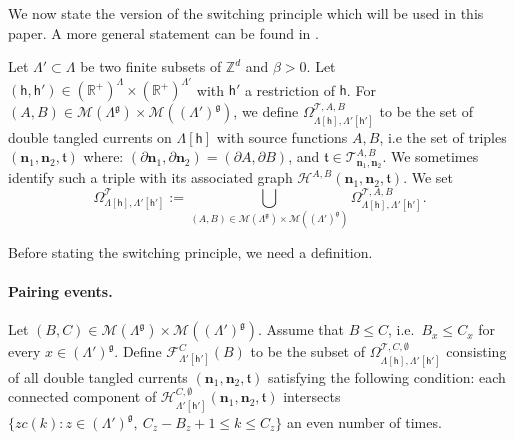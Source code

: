 \documentclass[11pt,a4paper]{article}
\theoremstyle{definition}
\numberwithin{equation}{section}
\newcommand\n{\mathbf{n}}
\newcommand\fg{\mathfrak{g}}
\newcommand\ft{\mathfrak{t}}
\newcommand\sn{\partial\mathbf{n}}
\begin{document}
We now state the version of the switching principle which will be used in this paper. A more general statement can be found in \cite{GunaratnamPanagiotisPanisSeveroPhi42022}.

Let $\Lambda'\subset \Lambda$ be two finite subsets of $\mathbb Z^d$ and $\beta>0$. Let $(\mathsf{h},\mathsf{h}')\in (\mathbb R^+)^\Lambda\times (\mathbb R^+)^{\Lambda'}$ with $\mathsf{h}'$ a restriction of $\mathsf{h}$.
For $(A,B)\in \mathcal M(\Lambda^\fg)\times \mathcal{M}((\Lambda')^\fg)$, we define $ \Omega_{\Lambda[\mathsf{h}],\Lambda'[\mathsf{h}']}^{\mathcal{T},A,B}$ to be the set of double tangled currents on $\Lambda[\mathsf{h}]$ with source functions $A,B$, i.e the set of triples $(\n_1,\n_2,\ft)$ where: $(\sn_1,\sn_2)=(\partial A,\partial B)$, and $\ft \in \mathcal{T}^{A,B}_{\n_1,\n_2}$.  We sometimes identify such a triple with its associated graph $\mathcal H^{A,B}(\n_1,\n_2,\ft)$. We set
 \begin{equation}
 	\Omega^\mathcal{T}_{\Lambda[\mathsf{h}],\Lambda'[\mathsf{h}']}:=\bigcup_{(A,B)\in \mathcal M(\Lambda^\fg)\times \mathcal{M}((\Lambda')^\fg)}\Omega_{\Lambda[\mathsf{h}],\Lambda'[\mathsf{h}']}^{\mathcal{T},A,B}.
 \end{equation}
 
Before stating the switching principle, we need a definition.

\paragraph{Pairing events.} Let $(B, C)\in \mathcal M(\Lambda^\fg)\times \mathcal{M}((\Lambda')^\fg)$. Assume that $B\leq C$, i.e.\ $B_x\leq C_x$ for every $x\in (\Lambda')^\fg$. Define $\mathcal{F}_{\Lambda'[\mathsf{h}']}^{C}(B)$ to be the subset of $\Omega_{\Lambda[\mathsf{h}],\Lambda'[\mathsf{h}']}^{\mathcal{T},C,\emptyset}$ consisting of all double tangled currents $(\n_1,\n_2,\ft)$ satisfying the following condition: each connected component of $\mathcal H_{\Lambda'[\mathsf{h}']}^{C,\emptyset}(\n_1,\n_2,\ft)$ intersects $\{zc(k): z\in (\Lambda')^\fg, \: C_z-B_z+1\leq k \leq C_z\}$ an even number of times.
\end{document}
